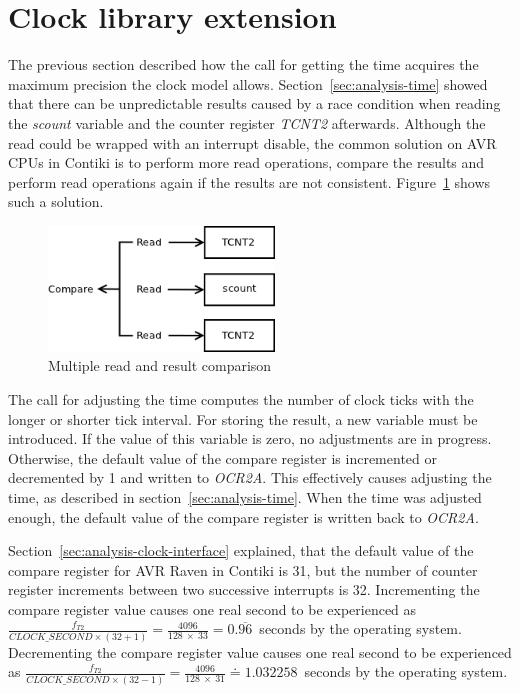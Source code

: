 
\section{Clock library extension}\label{sec:design-clock}
The previous section described how the call for getting the time acquires
the maximum precision the clock model allows.
Section~\ref{sec:analysis-time} showed that there can be unpredictable
results caused by a race condition when reading the {\it{scount}} variable
and the counter register {\it{TCNT2}} afterwards.
Although the read could be wrapped with an interrupt disable,
the common solution on AVR CPUs in Contiki is to perform more read operations,
compare the results and perform read operations again if the results are not consistent.
Figure~\ref{fig:design-read} shows such a solution.

\begin{figure}
  \centering
  \includegraphics[width=6cm,keepaspectratio]{fig/read.png}
  \caption{Multiple read and result comparison}
  \label{fig:design-read}
\end{figure}

The call for adjusting the time computes the number of clock ticks
with the longer or shorter tick interval.
For storing the result, a new variable must be introduced.
If the value of this variable is zero, no adjustments are in progress.
Otherwise, the default value of the compare register is incremented or decremented by 1
and written to {\it{OCR2A}}.
This effectively causes adjusting the time, as described in section~\ref{sec:analysis-time}.
When the time was adjusted enough,
the default value of the compare register is written back to {\it{OCR2A}}.

Section~\ref{sec:analysis-clock-interface} explained, that the default value
of the compare register for AVR Raven in Contiki is 31,
but the number of counter register increments between two successive interrupts is 32.
Incrementing the compare register value causes one real second to be experienced as
$\frac{f_{T2}}{CLOCK\_SECOND \times (32 + 1)} = \frac{4096}{128~\times~33} = 0.\overline{96}$~seconds
by the operating system.
Decrementing the compare register value causes one real second to be experienced as
$\frac{f_{T2}}{CLOCK\_SECOND \times (32 - 1)} = \frac{4096}{128~\times~31} \doteq 1.032258$~seconds
by the operating system.

